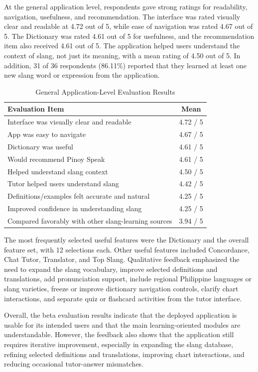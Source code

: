 At the general application level, respondents gave strong ratings for readability, navigation, usefulness, and recommendation. The interface was rated visually clear and readable at 4.72 out of 5, while ease of navigation was rated 4.67 out of 5. The Dictionary was rated 4.61 out of 5 for usefulness, and the recommendation item also received 4.61 out of 5. The application helped users understand the context of slang, not just its meaning, with a mean rating of 4.50 out of 5. In addition, 31 of 36 respondents (86.11\%) reported that they learned at least one new slang word or expression from the application.

\begin{table}[!t]
\centering
\caption{General Application-Level Evaluation Results}
\label{tab:general-evaluation}
\scriptsize
\setlength{\tabcolsep}{3pt}
\begin{tabular}{p{}c}
\toprule
\textbf{Evaluation Item} & \textbf{Mean} \\
\midrule
Interface was visually clear and readable & 4.72 / 5 \\
App was easy to navigate & 4.67 / 5 \\
Dictionary was useful & 4.61 / 5 \\
Would recommend Pinoy Speak & 4.61 / 5 \\
Helped understand slang context & 4.50 / 5 \\
Tutor helped users understand slang & 4.42 / 5 \\
Definitions/examples felt accurate and natural & 4.25 / 5 \\
Improved confidence in understanding slang & 4.25 / 5 \\
Compared favorably with other slang-learning sources & 3.94 / 5 \\
\bottomrule
\end{tabular}
\end{table}

The most frequently selected useful features were the Dictionary and the overall feature set, with 12 selections each. Other useful features included Concordance, Chat Tutor, Translator, and Top Slang. Qualitative feedback emphasized the need to expand the slang vocabulary, improve selected definitions and translations, add pronunciation support, include regional Philippine languages or slang varieties, freeze or improve dictionary navigation controls, clarify chart interactions, and separate quiz or flashcard activities from the tutor interface.

Overall, the beta evaluation results indicate that the deployed application is usable for its intended users and that the main learning-oriented modules are understandable. However, the feedback also shows that the application still requires iterative improvement, especially in expanding the slang database, refining selected definitions and translations, improving chart interactions, and reducing occasional tutor-answer mismatches.

